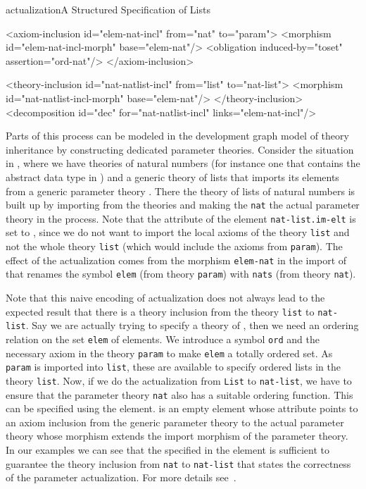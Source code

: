 \begin{myfig}{actualization}{A Structured Specification of Lists}
\begin{center}
\begin{boxedverbatim}
<axiom-inclusion id="elem-nat-incl" from="nat" to="param">
 <morphism id="elem-nat-incl-morph" base="elem-nat"/>
 <obligation induced-by="toset" assertion="ord-nat"/>
</axiom-inclusion>

<theory-inclusion id="nat-natlist-incl" from="list" to="nat-list">
 <morphism id="nat-natlist-incl-morph" base="elem-nat"/>
</theory-inclusion>
<decomposition id="dec" for="nat-natlist-incl" links="elem-nat-incl"/>
\end{boxedverbatim}
\end{center}
\end{myfig}

Parts of this process can be modeled in the {\omdoc} development graph model of theory
inheritance by constructing dedicated parameter theories. Consider the situation in
{}, where we have theories {} of natural numbers (for
instance one that contains the abstract data type in {}) and a generic
theory {} of lists that imports its elements from a generic parameter theory
{}.  There the theory {} of lists of natural numbers is built
up by importing from the theories {} and {} making the {\tt{nat}} the
actual parameter theory in the process. Note that the attribute
{} of the {} element {\tt{nat-list.im-elt}} is
set to {}, since we do not want to import the local axioms of
the theory {\tt{list}} and not the whole theory {\tt{list}} (which would include the
axioms from {\tt{param}}).  The effect of the actualization comes from the morphism
{\tt{elem-nat}} in the import of {} that renames the symbol {\tt{elem}} (from
theory {\tt{param}}) with {\tt{nats}} (from theory {\tt{nat}}).

Note that this naive encoding of actualization does not always lead to the
expected result that there is a theory inclusion from the theory {\tt{list}} to
{\tt{nat-list}}. Say we are actually trying to specify a theory of
{}, then we need an ordering relation
on the set {\tt{elem}} of elements. We introduce a symbol {\tt{ord}} and the
necessary axiom in the theory {\tt{param}} to make {\tt{elem}} a totally ordered
set. As {\tt{param}} is imported into {\tt{list}}, these are available to specify
ordered lists in the theory {\tt{list}}. Now, if we do the actualization from
{\tt{List}} to {\tt{nat-list}}, we have to ensure that the parameter theory
{\tt{nat}} also has a suitable ordering function. This can be specified using the
{\omdoc} {} element.  {} is an empty element
whose {} attribute points to an axiom inclusion from the
generic parameter theory to the actual parameter theory whose morphism extends the
import morphism of the parameter theory. In our examples we can see that the
{} specified in the {} element is
sufficient to guarantee the theory inclusion from {\tt{nat}} to {\tt{nat-list}}
that states the correctness of the parameter actualization. For more details
see~\cite{Hutter:mocsv00}.

